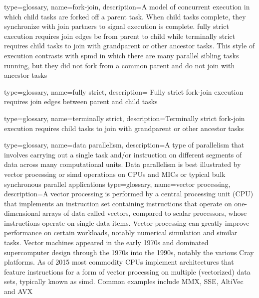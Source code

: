 {
  type=glossary,
  name={fork-join},
  description={A model of concurrent execution in which child tasks are forked
    off a parent task.  When child tasks complete, they synchronize with join
      partners to signal execution is complete.  \Gls{fully strict} execution
      requires join edges be from parent to child while \gls{terminally strict} requires child tasks to join with grandparent or other ancestor tasks. This style of execution contrasts with \gls{spmd} in which there are many parallel sibling tasks running, but they did not fork from a common parent and do not join with ancestor tasks}
}

{
  type=glossary,
  name={fully strict},
  description={ Fully strict \gls{fork-join} execution requires join edges between parent and
    child tasks} 
}

{
  type=glossary,
  name={terminally strict},
  description={Terminally strict \gls{fork-join} execution requires child tasks to join with
    grandparent or other ancestor tasks}
}

{
  type=glossary,
  name={data parallelism},
  description={A type of parallelism that involves carrying out a single task
    and/or instruction on different segments of data across many computational
      units. Data parallelism is best illustrated by \gls{vector processing} or \gls{simd} operations on
      \glspl{CPU} and \glspl{MIC} or typical \gls{bulk synchronous} parallel applications}
}
{
  type=glossary,
  name={vector processing},
  description={A vector processing is performed by a central
  processing unit (\gls{CPU}) that implements an instruction set containing
  instructions that operate on one-dimensional arrays of data called
  vectors, compared to scalar processors, whose instructions operate
  on single data items. Vector processing can greatly improve
  performance on certain workloads, notably numerical simulation and
  similar tasks. Vector machines appeared in the early 1970s and
  dominated supercomputer design through the 1970s into the 1990s,
  notably the various Cray platforms. As of 2015 most commodity \glspl{CPU}
  implement architectures that feature instructions for a form of
  vector processing on multiple (vectorized) data sets, typically
  known as \gls{simd}. Common examples include MMX, \gls{SSE},
  AltiVec and \gls{AVX}}
}

